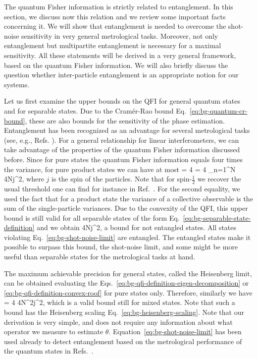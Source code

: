 
The quantum Fisher information is strictly related to entanglement.
In this section, we discuss now this relation and we review some important facts concerning it.
We will show that entanglement is needed to overcome the shot-noise sensitivity in very general metrological tasks.
Moreover, not only entanglement but multipartite entanglement is necessary for a maximal sensitivity.
All these statements will be derived in a very general framework, based on the quantum Fisher information.
We will also briefly discuss the question whether inter-particle entanglement is an appropriate notion for our systems.

Let us first examine the upper bounds on the QFI for general quantum states and for separable states.
Due to the Cram\'er-Rao bound Eq.~\eqref{eq:bg-quantum-cr-bound}, these are also bounds for the sensitivity of the phase estimation.
Entanglement has been recognized as an advantage for several metrological tasks (see, e.g., Refs. \cite{Sorensen2001, Boixo2008}).
For a general relationship for linear interferometers, we can take advantage of the properties of the quantum Fisher information discussed before.
Since for pure states the quantum Fisher information equals four times the variance, for pure product states we can have at most
\be
   = 4 = 4 \sum_{n=1}^N  \leqslant 4Nj^2,
\ee
where $j$ is the spin of the particles.
Note that for spin-$\frac{1}{2}$ we recover the usual threshold one can find for instance in Ref.~\cite{Giovannetti2006}.
For the second equality, we used the fact that for a product state the variance of a collective observable is the sum of the single-particle variances.
Due to the convexity of the QFI, this upper bound is still valid for all separable states of the form Eq.~\eqref{eq:bg-separable-state-definition} and we obtain \cite{Pezze2009}
\be
  \label{eq:bg-shot-noise-limit}
   \leqslant 4Nj^2,
\ee
a bound for not entangled states.
All states violating Eq.~\eqref{eq:bg-shot-noise-limit} are entangled.
The entangled states make it possible to surpass this bound, the shot-noise limit, and some might be more useful than separable states for the metrological tasks at hand.

The maximum achievable precision for general states, called the Heisenberg limit, can be obtained evaluating the Eqs.~\eqref{eq:bg-qfi-definition-eigen-decomposition} or \eqref{eq:bg-qfi-definition-convex-roof} for pure states only.
Therefore, similarly we have
\be
  \label{eq:bg-heisenberg-limit}
   = 4 \leqslant 4N^2j^2,
\ee
which is a valid bound still for mixed states.
Note that such a bound has the Heisenberg scaling Eq.~\eqref{eq:bg-heisenberg-scaling}.
Note that our derivation is very simple, and does not require any information about what operator we measure to estimate $\theta$.
Equation~\eqref{eq:bg-shot-noise-limit} has been used already to detect entanglement based on the metrological performance of the quantum states in Refs.~\cite{Krischek2011, Luecke2011}.

